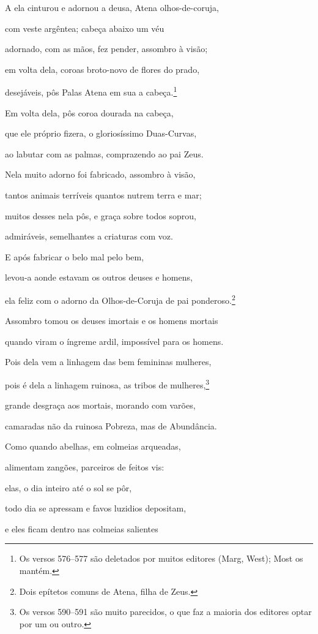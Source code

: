 \begin{pages}
\begin{Rightside}
A ela cinturou e adornou a deusa, Atena olhos-de-coruja,

com veste argêntea; cabeça abaixo um véu

adornado, com as mãos, fez pender, assombro à visão; 

em volta dela, coroas broto-novo de flores do prado,

desejáveis, pôs Palas Atena em sua a cabeça.\footnote{Os versos 576--577 são deletados por muitos editores (Marg, West); Most os mantém.}

Em volta dela, pôs coroa dourada na cabeça,

que ele próprio fizera, o gloriosíssimo Duas-Curvas,

ao labutar com as palmas, comprazendo ao pai Zeus. 

Nela muito adorno foi fabricado, assombro à visão,

tantos animais terríveis quantos nutrem terra e mar;

muitos desses nela pôs, e graça sobre todos soprou,

admiráveis, semelhantes a criaturas com voz.

\quad{}E após fabricar o belo mal pelo bem, 

levou-a aonde estavam os outros deuses e homens,

ela feliz com o adorno da Olhos-de-Coruja de pai ponderoso.\footnote{Dois epítetos comuns de Atena, filha de Zeus.}

Assombro tomou os deuses imortais e os homens mortais

quando viram o íngreme ardil, impossível para os homens.

Pois dela vem a linhagem das bem femininas mulheres, 

pois é dela a linhagem ruinosa, as tribos de mulheres,\footnote{Os versos 590--591 são muito parecidos, o que faz a maioria dos editores optar
por um ou outro.}

grande desgraça aos mortais, morando com varões,

camaradas não da ruinosa Pobreza, mas de Abundância.

Como quando abelhas, em colmeias arqueadas,

alimentam zangões, parceiros de feitos vis: 

elas, o dia inteiro até o sol se pôr,

todo dia se apressam e favos luzidios depositam,

e eles ficam dentro nas colmeias salientes


\end{Rightside}
\end{pages}
